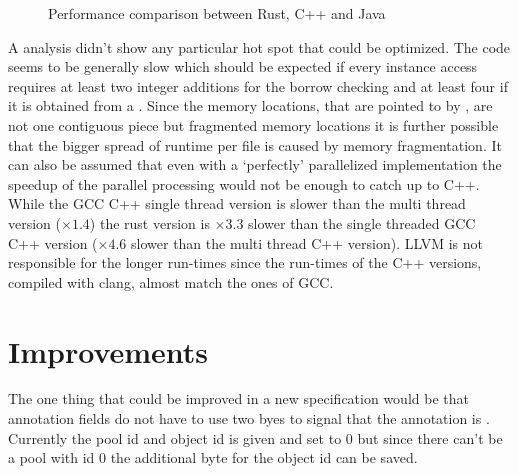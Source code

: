 \documentclass[thesis]{subfiles}
\begin{document}
  \begin{figure}[ht]
    \centering
    \hspace*{4em}



    \subfloat[Lograrithmic graph of all test files, with guide line $y=10x$.\label{fig:benchLog}]{}
    \caption{Performance comparison between Rust, C++ and Java}\label{fig:bench}
  \end{figure}

  A  analysis didn't show any particular hot spot that could be optimized.
  The code seems to be generally slow which should be expected if every \PtrT instance access requires at least two integer additions for the borrow checking and at least four if it is obtained from a \UserTypePool.
  Since the memory locations, that are pointed to by \PtrT, are not one contiguous piece but fragmented memory locations it is further possible that the bigger spread of runtime per file is caused by memory fragmentation.
  It can also be assumed that even with a `perfectly' parallelized implementation the speedup of the parallel processing would not be enough to catch up to C++.
  While the GCC C++ single thread version is slower than the multi thread version ($\times 1.4$) the rust version is $\times 3.3$ slower than the single threaded GCC C++ version ($\times 4.6$ slower than the multi thread C++ version).
  LLVM is not responsible for the longer run-times since the run-times of the C++ versions, compiled with clang, almost match the ones of GCC.

\section{ Improvements}
  The one thing that could be improved in a new specification would be that annotation fields do not have to use two byes to signal that the annotation is .
  Currently the pool id and object id is given and set to 0 but since there can't be a pool with id 0 the additional byte for the object id can be saved.
\end{document}
